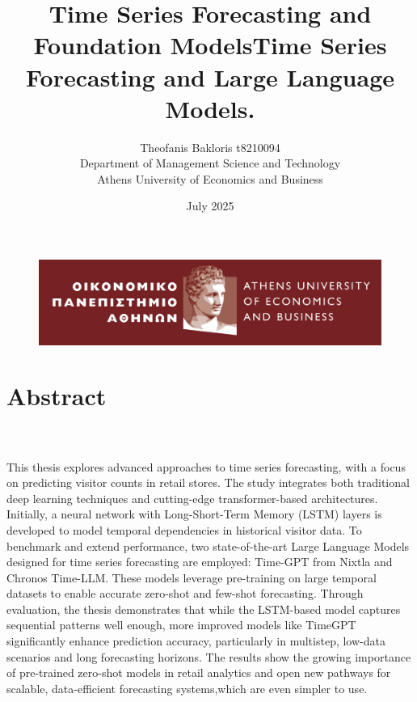 \documentclass{article}
\begin{document}
\begin{figure}
    \includegraphics[width=1\linewidth]{images/1_AUEB-pantone-HR.jpg}
\label{fig:enter-label}
\end{figure}


\title{\textbf{Time Series Forecasting and Foundation Models}}
\author{Theofanis Bakloris t8210094\\
Department of Management Science and Technology \\
Athens University of Economics and Business}
\date{July 2025}

\newpage
\maketitle
\tableofcontents 

\newpage
\section{Abstract}
\title{\textbf{Time Series Forecasting and Large Language Models.}} \\
\\
This thesis explores advanced approaches to time series forecasting, with a focus on predicting visitor counts in retail stores. The study integrates both traditional deep learning techniques and cutting-edge transformer-based architectures. Initially, a neural network with Long-Short-Term Memory (LSTM) layers is developed to model temporal dependencies in historical visitor data. To benchmark and extend performance, two state-of-the-art Large Language Models designed for time series forecasting are employed: Time-GPT from Nixtla and Chronos Time-LLM. These models leverage pre-training on large temporal datasets to enable accurate zero-shot and few-shot forecasting. Through evaluation, the thesis demonstrates that while the LSTM-based model captures sequential patterns well enough, more improved models like TimeGPT significantly enhance prediction accuracy, particularly in multistep, low-data scenarios and long forecasting horizons. The results show the growing importance of pre-trained zero-shot models in retail analytics and open new pathways for scalable, data-efficient forecasting systems,which are even simpler to use.
\end{document}

